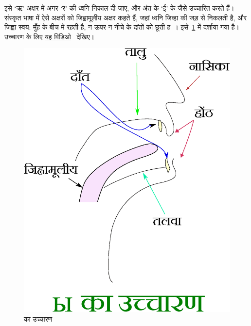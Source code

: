 \subsubsection{}\label{subsubsec:alpha-pronounce-special-char-oui}
इसे `ऋ' अक्षर में अगर `र' की ध्वनि निकाल दी जाए, और अंत के `ई' के जैसे उच्चारित करते हैं। संस्कृत भाषा में
ऐसे अक्षरों को जिह्वामूलीय अक्षर कहते हैं, जहां ध्वनि जिव्हा की जड़ से निकलती है, और जिह्वा स्वय: मुँह के
बीच में रहती है, न ऊपर न नीचे के दांतों को छूती ह~\cite{macdonald1926}। इसे~\ref{fig:intro-pronounce-oui} में दर्शाया गया है।
उच्चारण के लिए \href{https://www .youtube .com/watch?v=s6asiEL1f8U}{यह विडिओ}~\cite{kovalenko2015} देखिए।
\begin{figure}
    \label{fig:intro-pronounce-oui}
    \includegraphics[scale=0.35]{graphics/pronounce-oui}
    \caption{ का उच्चारण}
\end{figure}
